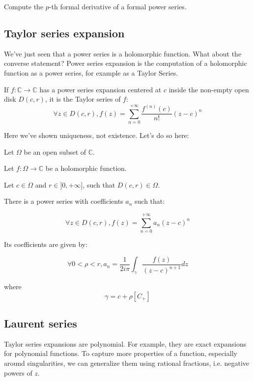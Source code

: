 \begin{exo}
    Compute the $p$-th formal derivative of a formal power series.
\end{exo}

\subsection{Taylor series expansion}
We've just seen that a power series is a holomorphic function. What about the converse statement? Power series expansion is the computation of a holomorphic function as a power series, for example as a Taylor Series.


\begin{thm*}
    If $f : \mathbb{C} \rightarrow \mathbb{C}$ has a power series expansion centered at $c$ inside the non-empty open disk $D(c,r)$, it is the Taylor series of $f$:
    $$\forall z \in D(c,r), f(z) = \sum_{n=0}^{+\infty}\frac{f^{(n)}(c)}{n!}(z-c)^n$$
\end{thm*}

Here we've shown uniqueness, not existence. Let's do so here:

\begin{thm*}
    Let $\Omega$ be an open subset of $\mathbb{C}$.

    Let $f: \Omega \rightarrow \mathbb{C}$ be a holomorphic function.
    
    Let $c\in\Omega$ and $r\in]0, +\infty]$, such that $D(c,r)\in\Omega$.

    There is a power series with coefficients $a_n$ such that:

    $$ \forall z \in D(c, r), f(z) = \sum_{n=0}^{+\infty}a_n(z-c)^n$$

Its coefficients are given by:

$$ \forall 0 < \rho < r, 
a_n = \frac{1}{2i\pi} \int_\gamma \frac{f(z)}{{(z-c)^{n+1}}}dz$$

where 
$$ \gamma = c + \rho[C_+]$$
\end{thm*}

\subsection{Laurent series}
Taylor series expansions are polynomial. For example, they are exact expansions for polynomial functions. To capture more properties of a function, especially around singularities, we can generalize them using rational fractions, i.e. negative powers of $z$.

